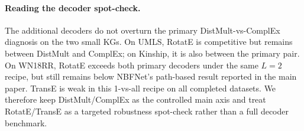 \paragraph{Reading the decoder spot-check.}
The additional decoders do not overturn the primary DistMult-vs-ComplEx diagnosis on the two small KGs. On UMLS, RotatE is competitive but remains between DistMult and ComplEx; on Kinship, it is also between the primary pair. On WN18RR, RotatE exceeds both primary decoders under the same $L{=}2$ recipe, but still remains below NBFNet's path-based result reported in the main paper. TransE is weak in this 1-vs-all recipe on all completed datasets. We therefore keep DistMult/ComplEx as the controlled main axis and treat RotatE/TransE as a targeted robustness spot-check rather than a full decoder benchmark.

\begin{table}[H]
\centering
\caption{Decoder MRR vs.\ embedding dim $d$, $L{=}2$ recipe held fixed, 3 seeds per cell (6 for UMLS/Kinship $d{=}200$).}
\label{tab:dscan}
\footnotesize
\setlength{\tabcolsep}{3pt}
\end{table}

